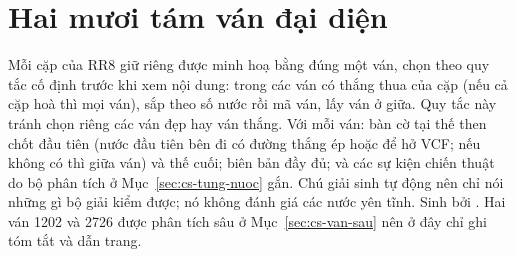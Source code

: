 \chapter{Hai mươi tám ván đại diện}
\label{app:van}
Mỗi cặp của RR8 giữ riêng được minh hoạ bằng đúng một ván, chọn theo quy tắc cố định trước khi xem nội dung: trong các
ván có thắng thua của cặp (nếu cả cặp hoà thì mọi ván), sắp theo số nước rồi mã ván, lấy ván ở giữa. Quy tắc này tránh
chọn riêng các ván đẹp hay ván thắng. Với mỗi ván: bàn cờ tại thế then chốt đầu tiên (nước đầu tiên bên đi có đường
thắng ép hoặc để hở VCF; nếu không có thì giữa ván) và thế cuối; biên bản đầy đủ; và các sự kiện chiến thuật do bộ
phân tích ở Mục~\ref{sec:cs-tung-nuoc} gắn. Chú giải sinh tự động nên chỉ nói những gì bộ giải kiểm được; nó không đánh
giá các nước yên tĩnh. Sinh bởi .
Hai ván 1202 và 2726 được phân tích sâu ở Mục~\ref{sec:cs-van-sau} nên ở đây chỉ ghi tóm tắt và dẫn trang.
\clearpage

